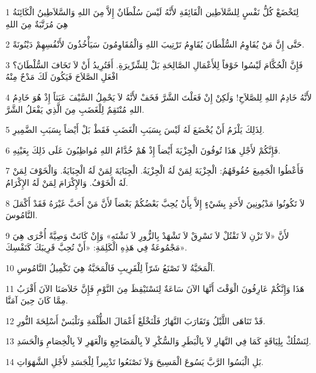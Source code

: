 \par 1 لِتَخْضَعْ كُلُّ نَفْسٍ لِلسَّلاَطِين الْفَائِقَةِ لأَنَّهُ لَيْسَ سُلْطَانٌ إِلاَّ مِنَ اللهِ وَالسَّلاَطِينُ الْكَائِنَةُ هِيَ مُرَتَّبَةٌ مِنَ اللهِ
\par 2 حَتَّى إِنَّ مَنْ يُقَاوِمُ السُّلْطَانَ يُقَاوِمُ تَرْتِيبَ اللهِ وَالْمُقَاوِمُونَ سَيَأْخُذُونَ لأَنْفُسِهِمْ دَيْنُونَةً.
\par 3 فَإِنَّ الْحُكَّامَ لَيْسُوا خَوْفاً لِلأَعْمَالِ الصَّالِحَةِ بَلْ لِلشِّرِّيرَةِ. أَفَتُرِيدُ أَنْ لاَ تَخَافَ السُّلْطَانَ؟ افْعَلِ الصَّلاَحَ فَيَكُونَ لَكَ مَدْحٌ مِنْهُ
\par 4 لأَنَّهُ خَادِمُ اللهِ لِلصَّلاَحِ! وَلَكِنْ إِنْ فَعَلْتَ الشَّرَّ فَخَفْ لأَنَّهُ لاَ يَحْمِلُ السَّيْفَ عَبَثاً إِذْ هُوَ خَادِمُ اللهِ مُنْتَقِمٌ لِلْغَضَبِ مِنَ الَّذِي يَفْعَلُ الشَّرَّ.
\par 5 لِذَلِكَ يَلْزَمُ أَنْ يُخْضَعَ لَهُ لَيْسَ بِسَبَبِ الْغَضَبِ فَقَطْ بَلْ أَيْضاً بِسَبَبِ الضَّمِيرِ.
\par 6 فَإِنَّكُمْ لأَجْلِ هَذَا تُوفُونَ الْجِزْيَةَ أَيْضاً إِذْ هُمْ خُدَّامُ اللهِ مُواظِبُونَ عَلَى ذَلِكَ بِعَيْنِهِ.
\par 7 فَأَعْطُوا الْجَمِيعَ حُقُوقَهُمُ: الْجِزْيَةَ لِمَنْ لَهُ الْجِزْيَةُ. الْجِبَايَةَ لِمَنْ لَهُ الْجِبَايَةُ. وَالْخَوْفَ لِمَنْ لَهُ الْخَوْفُ. وَالإِكْرَامَ لِمَنْ لَهُ الإِكْرَامُ.
\par 8 لاَ تَكُونُوا مَدْيُونِينَ لأَحَدٍ بِشَيْءٍ إِلاَّ بِأَنْ يُحِبَّ بَعْضُكُمْ بَعْضاً لأَنَّ مَنْ أَحَبَّ غَيْرَهُ فَقَدْ أَكْمَلَ النَّامُوسَ.
\par 9 لأَنَّ «لاَ تَزْنِ لاَ تَقْتُلْ لاَ تَسْرِقْ لاَ تَشْهَدْ بِالزُّورِ لاَ تَشْتَهِ» وَإِنْ كَانَتْ وَصِيَّةً أُخْرَى هِيَ مَجْمُوعَةٌ فِي هَذِهِ الْكَلِمَةِ: «أَنْ تُحِبَّ قَرِيبَكَ كَنَفْسِكَ».
\par 10 اَلْمَحَبَّةُ لاَ تَصْنَعُ شَرّاً لِلْقَرِيبِ فَالْمَحَبَّةُ هِيَ تَكْمِيلُ النَّامُوسِ.
\par 11 هَذَا وَإِنَّكُمْ عَارِفُونَ الْوَقْتَ أَنَّهَا الآنَ سَاعَةٌ لِنَسْتَيْقِظَ مِنَ النَّوْمِ فَإِنَّ خَلاَصَنَا الآنَ أَقْرَبُ مِمَّا كَانَ حِينَ آمَنَّا.
\par 12 قَدْ تَنَاهَى اللَّيْلُ وَتَقَارَبَ النَّهَارُ فَلْنَخْلَعْ أَعْمَالَ الظُّلْمَةِ وَنَلْبَسْ أَسْلِحَةَ النُّورِ.
\par 13 لِنَسْلُكْ بِلِيَاقَةٍ كَمَا فِي النَّهَارِ لاَ بِالْبَطَرِ وَالسُّكْرِ لاَ بِالْمَضَاجِعِ وَالْعَهَرِ لاَ بِالْخِصَامِ وَالْحَسَدِ.
\par 14 بَلِ الْبَسُوا الرَّبَّ يَسُوعَ الْمَسِيحَ وَلاَ تَصْنَعُوا تَدْبِيراً لِلْجَسَدِ لأَجْلِ الشَّهَوَاتِ.

